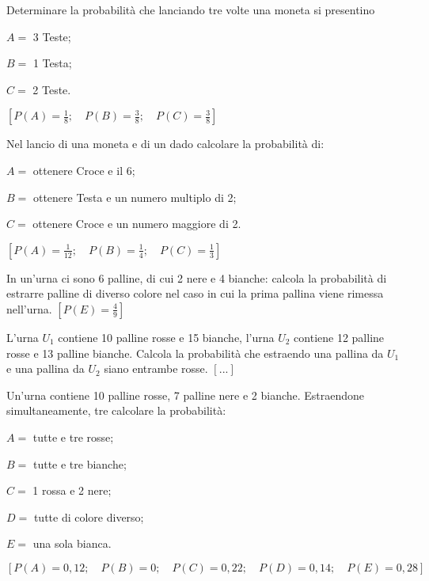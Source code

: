 \begin{esercizio}[\Ast]
 \label{ese:9.56}
Determinare la probabilità che lanciando tre volte una moneta si presentino
\begin{itemize*}
\item \( A= \) 3 Teste;
\item \( B= \) 1 Testa;
\item \( C= \) 2 Teste.
\end{itemize*}
\hfill \(\left[P(A)=\frac 1 8; \quad P(B)=\frac3 8; \quad P(C)=\frac 3 8\right]\)
\end{esercizio}

\begin{esercizio}[\Ast]
 \label{ese:9.57}
Nel lancio di una moneta e di un dado calcolare la probabilità di:
\begin{itemize*}
\item \( A= \) ottenere Croce e il 6;
\item \( B= \) ottenere Testa e un numero multiplo di 2;
\item \( C= \) ottenere Croce e un numero maggiore di 2.
\end{itemize*}
\hfill \(\left[P(A)=\frac 1 {12}; \quad P(B)=\frac1 4; \quad 
P(C)=\frac 1 3\right]\)
\end{esercizio}

\begin{esercizio}[\Ast]
 \label{ese:9.58}
In un'urna ci sono 6 palline, di cui 2 nere e 4 bianche: calcola la probabilità 
di estrarre palline di diverso colore nel caso in cui la prima pallina viene 
rimessa nell'urna.
\hfill \(\left[P(E)=\frac 4 9\right]\)
\end{esercizio}

\begin{esercizio}
 \label{ese:9.59}
L'urna \( U_1 \) contiene 10 palline rosse e 15 bianche, l'urna \( U_2 \) contiene 
12 palline rosse e 13 palline bianche. Calcola la probabilità che estraendo una 
pallina da \( U_1 \) e una pallina da \( U_2 \) siano entrambe rosse.
\hfill \(\left[...\right]\)
\end{esercizio}

\begin{esercizio}[\Ast]
 \label{ese:9.60}
 Un'urna contiene 10 palline rosse, 7 palline nere e 2 bianche. Estraendone 
simultaneamente, tre calcolare la probabilità:
\begin{itemize*}
 \item \( A= \) tutte e tre rosse;
 \item \( B= \) tutte e tre bianche;
 \item \( C= \) 1 rossa e 2 nere;
 \item \( D= \) tutte di colore diverso;
 \item \( E= \) una sola bianca.
\end{itemize*}
\hfill \(\left[P(A)=0,12; \quad P(B)=0; \quad P(C)=0,22; \quad P(D)=0,14; \quad 
P(E)=0,28\right]\)
\end{esercizio}

